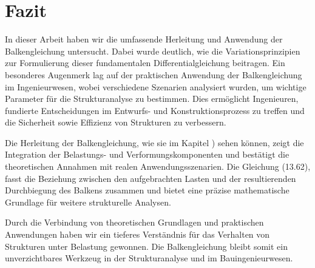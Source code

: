 %
%
%
%
\section{Fazit\label{balken:section:teil4}}

In dieser Arbeit haben wir die umfassende Herleitung und Anwendung der Balkengleichung untersucht. Dabei wurde deutlich, wie die Variationsprinzipien zur Formulierung dieser fundamentalen Differentialgleichung beitragen. Ein besonderes Augenmerk lag auf der praktischen Anwendung der Balkengleichung im Ingenieurwesen, wobei verschiedene Szenarien analysiert wurden, um wichtige Parameter für die Strukturanalyse zu bestimmen. Dies ermöglicht Ingenieuren, fundierte Entscheidungen im Entwurfs- und Konstruktionsprozess zu treffen und die Sicherheit sowie Effizienz von Strukturen zu verbessern.

Die Herleitung der Balkengleichung, wie sie im Kapitel \cite{balken:Balkentheorie}) sehen können, zeigt die Integration der Belastungs- und Verformungskomponenten und bestätigt die theoretischen Annahmen mit realen Anwendungsszenarien. Die Gleichung (13.62), fasst die Beziehung zwischen den aufgebrachten Lasten und der resultierenden Durchbiegung des Balkens zusammen und bietet eine präzise mathematische Grundlage für weitere strukturelle Analysen.

Durch die Verbindung von theoretischen Grundlagen und praktischen Anwendungen haben wir ein tieferes Verständnis für das Verhalten von Strukturen unter Belastung gewonnen. Die Balkengleichung bleibt somit ein unverzichtbares Werkzeug in der Strukturanalyse und im Bauingenieurwesen.


